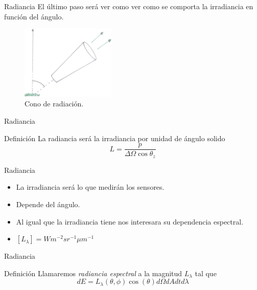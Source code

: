 \documentclass[handout]{beamer}
\begin{document}
\begin{frame}{Radiancia}
  El último paso será ver como ver como se comporta la irradiancia en función del ángulo.
  \begin{figure}
    \includegraphics[width=0.4\textwidth]{imagenes/radiancia.png}
    \caption{Cono de radiación.}
  \end{figure}
\end{frame}

\begin{frame}{Radiancia}
  \begin{block}{Definición}
    La radiancia será la irradiancia por unidad de ángulo solido
    \begin{equation}
      L = \frac{p}{\Delta \Omega \cos\theta_z}
    \end{equation}
  \end{block}
\end{frame}

\begin{frame}{Radiancia}
  \begin{itemize}[<+>]
    \item La irradiancia será lo que medirán los sensores.
    \item Depende del ángulo.
    \item Al igual que la irradiancia tiene nos interesara su dependencia espectral.
    \item $[L_\lambda] = W m^{-2} sr^{-1} \mu m^{-1}$
  \end{itemize}
\end{frame}

\begin{frame}{Radiancia}
  \begin{block}{Definición}
    Llamaremos \emph{radiancia espectral} a la magnitud $L_\lambda$ tal que
    \begin{equation}
      dE = L_{\lambda}(\theta,\phi) \cos(\theta) d\Omega dA dt d\lambda
    \end{equation}
  \end{block}
\end{frame}
\end{document}

